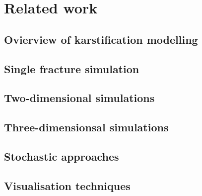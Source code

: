 \chapter{Related work}
\label{chap:related}
\section{Ovierview of karstification modelling}
\section{Single fracture simulation}
\section{Two-dimensional simulations}
\section{Three-dimensionsal simulations}
\section{Stochastic approaches}
\section{Visualisation techniques}
